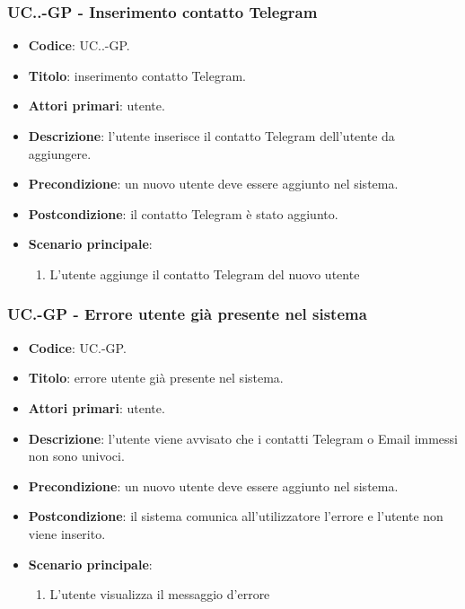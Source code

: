 		\subsubsection{UC\theuccount.\thesubuccount.\thesubsubuccount-GP - Inserimento contatto Telegram}
			
			\begin{itemize}
				\item \textbf{Codice}: UC\theuccount.\thesubuccount.\thesubsubuccount-GP.
				\item \textbf{Titolo}: inserimento contatto Telegram.
				\item \textbf{Attori primari}: utente.
				\item \textbf{Descrizione}: l'utente inserisce il contatto Telegram dell'utente da aggiungere.
				\item \textbf{Precondizione}: un nuovo utente deve essere aggiunto nel sistema.
				\item \textbf{Postcondizione}: il contatto Telegram è stato aggiunto.
				\item \textbf{Scenario principale}:
				\begin{enumerate}
					\item L'utente aggiunge il contatto Telegram del nuovo utente
				\end{enumerate}
			\end{itemize}
	
	\subsubsection{UC\theuccount.\thesubuccount-GP - Errore utente già presente nel sistema}
		
		\begin{itemize}
			\item \textbf{Codice}: UC\theuccount.\thesubuccount-GP.
			\item \textbf{Titolo}: errore utente già presente nel sistema.
			\item \textbf{Attori primari}: utente.
			\item \textbf{Descrizione}: l’utente viene avvisato che i contatti Telegram o Email immessi non sono univoci.
			\item \textbf{Precondizione}: un nuovo utente deve essere aggiunto nel sistema.
			\item \textbf{Postcondizione}: il sistema comunica all’utilizzatore l’errore e l'utente non viene inserito.
			\item \textbf{Scenario principale}:
			\begin{enumerate}
				\item L'utente visualizza il messaggio d'errore
			\end{enumerate}
			\end{itemize}